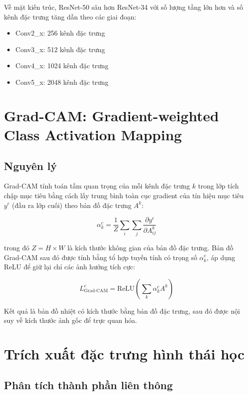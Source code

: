 Về mặt kiến trúc, ResNet-50 sâu hơn ResNet-34 với số lượng tầng lớn hơn và số kênh đặc trưng tăng dần theo các giai đoạn:

\begin{itemize}
    \item Conv2\_x: 256 kênh đặc trưng
    \item Conv3\_x: 512 kênh đặc trưng
    \item Conv4\_x: 1024 kênh đặc trưng
    \item Conv5\_x: 2048 kênh đặc trưng
\end{itemize}

\section{Grad-CAM: Gradient-weighted Class Activation Mapping}

\subsection{Nguyên lý}

Grad-CAM \cite{Selvaraju2017} tính toán tầm quan trọng của mỗi kênh đặc trưng $k$ trong lớp tích chập mục tiêu bằng cách lấy trung bình toàn cục gradient của tín hiệu mục tiêu $y^c$ (đầu ra lớp cuối) theo bản đồ đặc trưng $A^k$:

\begin{equation}
    \alpha_k^c = \frac{1}{Z} \sum_i \sum_j \frac{\partial y^c}{\partial A_{ij}^k}
    \label{eq:gradcam_weight}
\end{equation}

trong đó $Z = H \times W$ là kích thước không gian của bản đồ đặc trưng. Bản đồ Grad-CAM sau đó được tính bằng tổ hợp tuyến tính có trọng số $\alpha_k^c$, áp dụng ReLU để giữ lại chỉ các ảnh hưởng tích cực:

\begin{equation}
    L_{\text{Grad-CAM}}^c = \text{ReLU}\!\left( \sum_k \alpha_k^c A^k \right)
    \label{eq:gradcam_map}
\end{equation}

Kết quả là bản đồ nhiệt có kích thước bằng bản đồ đặc trưng, sau đó được nội suy về kích thước ảnh gốc để trực quan hóa.

\section{Trích xuất đặc trưng hình thái học}

\subsection{Phân tích thành phần liên thông}

